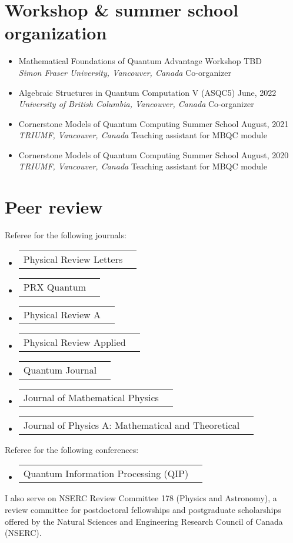 \documentclass[letterpaper,11pt]{article}
\makeatletter
\newcommand{\OrganizerItem}[4]{
	\item{\parbox{0.97\textwidth}{
			{#1} \hfill {#2}\\
			\emph{#3} \hfill {#4}
		}}
}
\newcommand{\AwardsItem}[2]{
	\item{\vspace{-1pt}
		\begin{tabular*}{0.97\textwidth}{l@{\extracolsep{\fill}}r}
			{#1} & {#2}
		\end{tabular*}
		\vspace{-5pt}
	}
}
\newcommand{\SkillsItem}[2]{
	\item{\vspace{-1pt}
		\begin{tabular*}{0.97\textwidth}{l l}
			{#1:} & {#2}
		\end{tabular*}
		\vspace{-5pt}
	}
}
\makeatother
\begin{document}
\section*{Workshop \& summer school organization}
\begin{itemize}[leftmargin=*]
	\OrganizerItem{Mathematical Foundations of Quantum Advantage Workshop}{TBD}{Simon Fraser University, Vancouver, Canada}{Co-organizer}
	\OrganizerItem{Algebraic Structures in Quantum Computation V (ASQC5)}{June, 2022}{University of British Columbia, Vancouver, Canada}{Co-organizer}
	\OrganizerItem{Cornerstone Models of Quantum Computing Summer School}{August, 2021}{TRIUMF, Vancouver, Canada}{Teaching assistant for MBQC module}
	\OrganizerItem{Cornerstone Models of Quantum Computing Summer School}{August, 2020}{TRIUMF, Vancouver, Canada}{Teaching assistant for MBQC module}
\end{itemize}

\section*{Peer review}
Referee for the following journals:\vspace{-2mm}
\begin{itemize}[leftmargin=*]
	\AwardsItem{Physical Review Letters}{}
	\AwardsItem{PRX Quantum}{}
	\AwardsItem{Physical Review A}{}
	\AwardsItem{Physical Review Applied}{}
	\AwardsItem{Quantum Journal}{}
	\AwardsItem{Journal of Mathematical Physics}{}
	\AwardsItem{Journal of Physics A: Mathematical and Theoretical}{}
\end{itemize}
Referee for the following conferences:\vspace{-2mm}
\begin{itemize}[leftmargin=*]
	\AwardsItem{Quantum Information Processing (QIP)}{}
\end{itemize}

I also serve on NSERC Review Committee 178 (Physics and Astronomy), a review committee for postdoctoral fellowships and postgraduate scholarships offered by the Natural Sciences and Engineering Research Council of Canada (NSERC).

\end{document}
